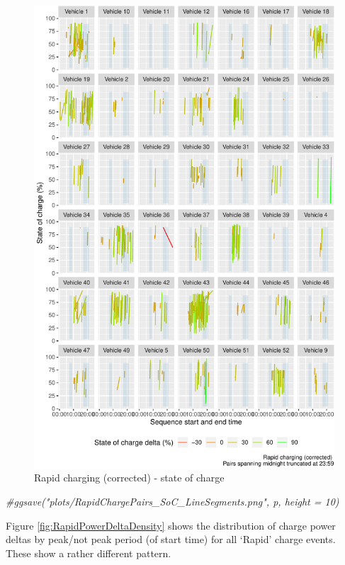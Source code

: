 \documentclass[]{article}
\newenvironment{Shaded}{\begin{snugshade}}{\end{snugshade}}
\newcommand{\CommentTok}[1]{\textcolor[rgb]{0.56,0.35,0.01}{\textit{#1}}}
\begin{document}
\begin{figure}
\centering
\includegraphics{EVBB_report_v1_files/figure-latex/checkRapidSequencesSoC-1.pdf}
\caption{\label{fig:checkRapidSequencesSoC}Rapid charging (corrected) - state of charge}
\end{figure}

\begin{Shaded}
\begin{Highlighting}[]
\CommentTok{#ggsave("plots/RapidChargePairs_SoC_LineSegments.png", p, height = 10)}
\end{Highlighting}
\end{Shaded}

Figure \ref{fig:RapidPowerDeltaDensity} shows the distribution of charge power deltas by peak/not peak period (of start time) for all `Rapid' charge events. These show a rather different pattern.
\end{document}
